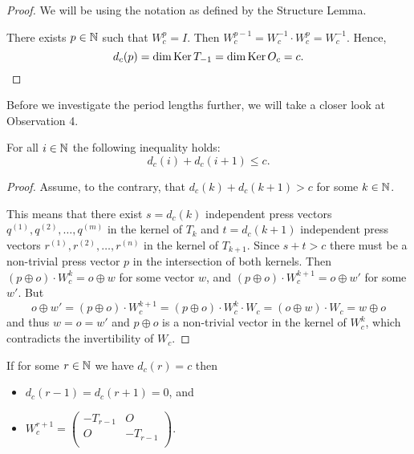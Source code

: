 \begin{proof}
  We will be using the notation as defined by the Structure Lemma.

  There exists $p\in\mathbb{N}$ such that $W_{c}^{p} = I$.
  Then $W_{c}^{p-1} = W_{c}^{-1} \cdot W_{c}^{p} = W_{c}^{-1}$.
  Hence,
  \[
  d_{c}(p)
  =
  \dim\operatorname{Ker} T_{-1}
  =
  \dim\operatorname{Ker} O_{c}
  = c.
  \]
\end{proof}
Before we investigate the period lengths further,
we will take a closer look at Observation 4.

\begin{theorem}[Observation 4]\label{thm:consec}
  For all $i\in\mathbb{N}$ the following inequality holds:
  \[d_{c}(i) + d_{c}(i+1) \leq c.\]
\end{theorem}
\begin{proof}
  Assume, to the contrary, that $d_{c}(k) + d_{c}(k+1) > c$ for some $k\in\mathbb{N}$.

  This means that there exist $s=d_{c}(k)$ independent press vectors
  $q^{(1)}, q^{(2)}, \ldots, q^{(m)}$ in the kernel of $T_k$ and
  $t = d_{c}(k+1)$ independent press vectors
  $r^{(1)}, r^{(2)}, \ldots, r^{(n)}$ in the kernel of $T_{k+1}$.
  Since $s+t>c$ there must be a non-trivial press vector $p$ in the intersection
  of both kernels. Then $(p\oplus o)\cdot W_c^{k} = o\oplus w$ for
  some vector $w$, and $(p\oplus o)\cdot W_c^{k+1}=o\oplus w'$ for some $w'$.
  But 
  \[
    o\oplus w'=(p\oplus o)\cdot W_c^{k+1}=(p\oplus o)\cdot W_c^{k}\cdot W_c=(o\oplus w)\cdot W_c=w\oplus o
  \]
  and thus $w=o=w'$ and $p\oplus o$ is a non-trivial vector in the kernel
  of $W_c^k$, which contradicts the invertibility of $W_c$.
\end{proof}

\begin{corollary}\label{cor:max}
  If for some $r\in\mathbb{N}$ we have $d_{c}(r) = c$ then
  \begin{itemize}
    \item $d_{c}(r-1) = d_{c}(r+1) = 0$, and
    \item $W_{c}^{r+1} = \left(\begin{smallmatrix} -T_{r-1} & O \\
                                  O & -T_{r-1} \\\end{smallmatrix}\right)$.
  \end{itemize}
\end{corollary}

